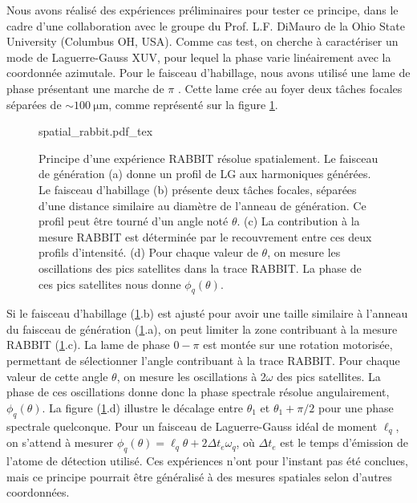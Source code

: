 Nous avons réalisé des expériences préliminaires pour tester ce principe, dans le cadre d'une collaboration avec le groupe du Prof. L.F. DiMauro de la Ohio State University (Columbus OH, USA). Comme cas test, on cherche à caractériser un mode de Laguerre-Gauss XUV, pour lequel la phase varie linéairement avec la coordonnée azimutale. Pour le faisceau d'habillage, nous avons utilisé une lame de phase présentant une marche de $\pi$ . Cette lame crée au foyer deux tâches focales séparées de $\sim \SI{100}{\micro\metre}$, comme représenté sur la figure \ref{fig:spatialrabbit}. 

\begin{figure}[!ht]
\centering
\def\svgwidth{\columnwidth}
{spatial_rabbit.pdf_tex}
\caption{Principe d'une expérience RABBIT résolue spatialement. Le faisceau de génération (a) donne un profil de LG aux harmoniques générées. Le faisceau d'habillage (b) présente deux tâches focales, séparées d'une distance similaire au diamètre de l'anneau de génération. Ce profil peut être tourné d'un angle noté $\theta$. (c) La contribution à la mesure RABBIT est déterminée par le recouvrement entre ces deux profils d'intensité. (d) Pour chaque valeur de $\theta$, on mesure les oscillations des pics satellites dans la trace RABBIT. La phase de ces pics satellites nous donne $\phi_q(\theta)$.}
\label{fig:spatialrabbit}
\end{figure}

Si le faisceau d'habillage (\ref{fig:spatialrabbit}.b) est ajusté pour avoir une taille similaire à l'anneau du faisceau de génération (\ref{fig:spatialrabbit}.a), on peut limiter la zone contribuant à la mesure RABBIT (\ref{fig:spatialrabbit}.c). La lame de phase $0-\pi$ est montée sur une rotation motorisée, permettant de sélectionner l'angle contribuant à la trace RABBIT. Pour chaque valeur de cette angle $\theta$, on mesure les oscillations à 2$\omega$ des pics satellites. La phase de ces oscillations donne donc la phase spectrale résolue angulairement, $\phi_q(\theta)$. La figure (\ref{fig:spatialrabbit}.d) illustre le décalage entre $\theta_1$ et $\theta_1+\pi/2$ pour une phase spectrale quelconque. Pour un faisceau de Laguerre-Gauss idéal de moment $\ell_q$, on s'attend à mesurer $\phi_q(\theta) = \ell_q\theta+2\Delta t_e\omega_q$, où $\Delta t_e$ est le temps d'émission de l'atome de détection utilisé. Ces expériences n'ont pour l'instant pas été conclues, mais ce principe pourrait être généralisé à des mesures spatiales selon d'autres coordonnées.

